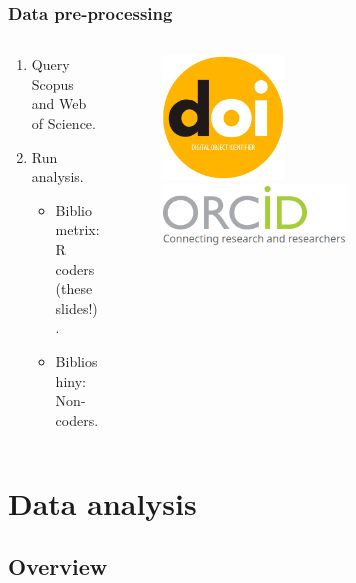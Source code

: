 \documentclass[aspectratio=169]{beamer}
\begin{document}
\begin{frame}
	\frametitle{Data pre-processing}
	\begin{columns}
		\begin{column}{0.5\textwidth}
			\begin{enumerate}
				\item Query Scopus and Web of Science.
				\item Run analysis.
				      \begin{itemize}
                          \item Bibliometrix: R coders (these slides!).
					      \item Biblioshiny: Non-coders.
				      \end{itemize}
			\end{enumerate}
		\end{column}
		\begin{column}{0.5\textwidth}
			\begin{figure}
				\centering
				\includegraphics[width=0.4\textwidth]{logos/logo_doi.png}\newline
				\includegraphics[width=0.6\textwidth]{logos/logo_orcid.png}
			\end{figure}
		\end{column}
	\end{columns}
\end{frame}



\section{Data analysis}

\subsection{Overview}
\end{document}
